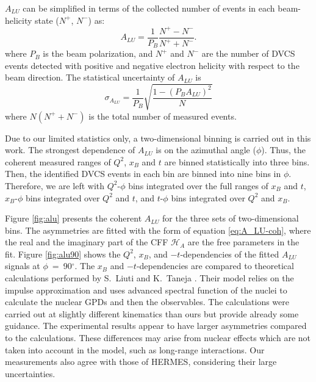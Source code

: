 \documentclass[nofootinbib,twocolumn,showpacs,prl,superscriptaddress,secnumarabic,amssymb,nobibnotes,aps,floatfix]{revtex4}
\begin{document}
$A_{LU}$ can be simplified in terms of the collected number of events in each 
beam-helicity state ($N^{+}$, $N^{-}$) as:
\begin{equation}
A_{LU} = \frac{1}{P_{B}} \frac{N^{+} - N^{-}}{N^{+} + N^{-} }.
\end{equation}
where $P_{B}$ is the beam polarization, and $N^{+}$ and $N^{-}$ are the number 
of DVCS events detected with positive and negative electron helicity with 
respect to the beam direction. The statistical uncertainty of $A_{LU}$ is
\begin{equation}
   \sigma_{A_{LU}} = \frac{1}{P_{B}} \sqrt{ \frac{1 - (P_{B}A_{LU})^{2}}{N}}
\end{equation}
where $N (N^{+} + N^{-}) $ is the total number of measured events.

Due to our limited statistics only, a two-dimensional binning is carried out in 
this work. The strongest dependence of $A_{LU}$ is on the azimuthal angle 
($\phi$). Thus, the coherent measured ranges of $Q^{2}$, $x_{B}$ and $t$ are 
binned statistically into three bins. Then, the identified DVCS events in each 
bin are binned into nine bins in $\phi$. Therefore, we are left
with $Q^{2}$-$\phi$ bins integrated over the full ranges of $x_{B}$ and $t$, 
$x_{B}$-$\phi$ bins integrated over $Q^{2}$ and $t$, and $t$-$\phi$ bins 
integrated over $Q^{2}$ and $x_{B}$.

Figure \ref{fig:alu} presents the coherent $A_{LU}$ for the three
sets of two-dimensional bins. The asymmetries are fitted with the form of
equation \ref{eq:A_LU-coh}, where the real and the imaginary part of the CFF
$\mathcal{H}_{A}$ are the free parameters in the fit. Figure \ref{fig:alu90} 
shows the $Q^2$, $x_{B}$, and $-t$-dependencies of the fitted $A_{LU}$ signals 
at $\phi$~=~90$^{\circ}$. The $x_{B}$ and $-t$-dependencies are compared to 
theoretical calculations performed by S.~Liuti and K.~Taneja 
\cite{simonetta_2}. Their model relies on the impulse approximation and uses 
advanced spectral function of the nuclei to calculate the nuclear GPDs and then 
the observables. The calculations were carried out at slightly different 
kinematics than ours but provide already some guidance. The experimental 
results appear to have larger asymmetries compared to the calculations.  These 
differences may arise from nuclear effects which are not taken into account in 
the model, such as long-range interactions. Our measurements also agree with 
those of HERMES, considering their large uncertainties.
\end{document}
